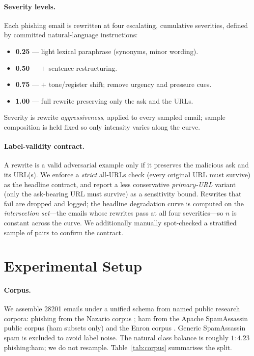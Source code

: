 \documentclass[11pt]{article}
\begin{document}
\paragraph{Severity levels.} Each phishing email is rewritten at four escalating,
cumulative severities, defined by committed natural-language instructions:
\begin{itemize}
  \item \textbf{0.25} --- light lexical paraphrase (synonyms, minor wording).
  \item \textbf{0.50} --- $+$ sentence restructuring.
  \item \textbf{0.75} --- $+$ tone/register shift; remove urgency and pressure cues.
  \item \textbf{1.00} --- full rewrite preserving only the ask and the URLs.
\end{itemize}
Severity is rewrite \emph{aggressiveness}, applied to every sampled email; sample
composition is held fixed so only intensity varies along the curve.

\paragraph{Label-validity contract.} A rewrite is a valid adversarial example only
if it preserves the malicious ask and its URL(s). We enforce a \emph{strict}
all-URLs check (every original URL must survive) as the headline contract, and
report a less conservative \emph{primary-URL} variant (only the ask-bearing URL
must survive) as a sensitivity bound. Rewrites that fail are dropped and logged;
the headline degradation curve is computed on the \emph{intersection set}---the
emails whose rewrites pass at all four severities---so $n$ is constant across the
curve. We additionally manually spot-checked a stratified sample of pairs to
confirm the contract.

\section{Experimental Setup}\label{sec:setup}
\paragraph{Corpus.} We assemble \num{28201} emails under a unified schema from
named public research corpora: phishing from the Nazario corpus
\citep{nazario}; ham from the Apache SpamAssassin public corpus
\citep{spamassassin} (ham subsets only) and the Enron corpus
\citep{klimt2004enron}. Generic SpamAssassin spam is excluded to avoid label
noise. The natural class balance is roughly $1\!:\!4.23$ phishing:ham; we do not
resample. Table~\ref{tab:corpus} summarises the split.
\end{document}
